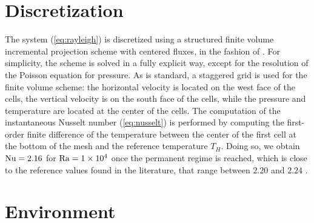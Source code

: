 
%
%
%
%
%
%
\section{Discretization}

The system (\ref{eq:rayleigh}) is discretized using a structured finite volume incremental projection scheme with centered fluxes, in the fashion of \cite{boivin2000}. For simplicity, the scheme is solved in a fully explicit way, except for the resolution of the Poisson equation for pressure. As is standard, a staggered grid is used for the finite volume scheme: the horizontal velocity is located on the west face of the cells, the vertical velocity is on the south face of the cells, while the pressure and temperature are located at the center of the cells. The computation of the instantaneous Nusselt number (\ref{eq:nusselt}) is performed by computing the first-order finite difference of the temperature between the center of the first cell at the bottom of the mesh and the reference temperature $T_H$. Doing so, we obtain $\text{Nu} = 2.16$  for $\text{Ra} = \num{1e4}$ once the permanent regime is reached, which is close to the reference values found in the literature, that range between $2.20$ and $2.24$ \cite{markatos1984}.

\section{Environment}

